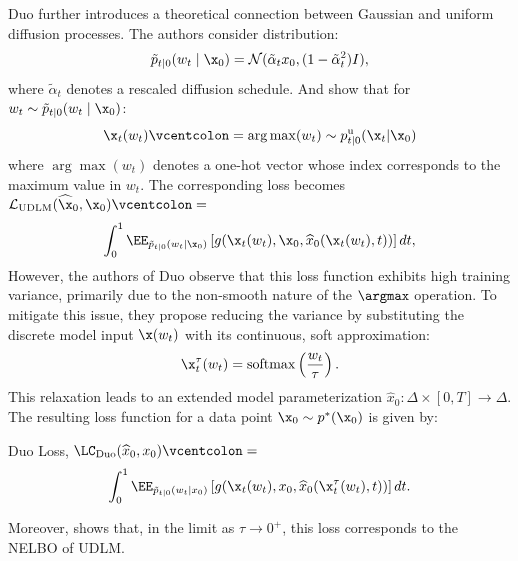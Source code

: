   Duo further introduces a theoretical connection between Gaussian and uniform diffusion processes. The authors consider distribution:
  \begin{equation}
    \tilde{p}_{t\mid 0}(w_t \mid \x_0) = \mathcal{N}(\tilde{\alpha}_t x_0, (1-\tilde{\alpha}_t^2)I), \nonumber
  \end{equation}
  where $\tilde{\alpha}_t$ denotes a rescaled diffusion schedule. And show that for $w_t \sim \tilde{p}_{t\mid 0}(w_t \mid \x_0)$:
  $$
    \x_t(w_t) \vcentcolon= \arg\max(w_t) \sim p_{t|0}^{\text{u}}(\x_t|\x_0)
  $$
  where $\arg\max(w_t)$ denotes a one-hot vector whose index corresponds to the maximum value in $w_t$.
  The corresponding loss becomes $\mathcal{L}_{\text{UDLM}}(\widehat{\x}_0,\x_0) \vcentcolon=$
  \begin{gather}
    \int_0^1 \EE_{\tilde{p}_{t\mid 0}(w_t\mid \x_0)} \left[g(\x_t(w_t),\x_0, \widehat{x}_0(\x_t(w_t), t))\right] dt, \nonumber
  \end{gather}
  However, the authors of Duo observe that this loss function exhibits high training variance, primarily due to the non-smooth nature of the $\argmax$ operation. To mitigate this issue, they propose reducing the variance by substituting the discrete model input $\x(w_t)$ with its continuous, soft approximation:
  \begin{equation}
      \x^{\tau}_{t}(w_t) = \mathrm{softmax}\left(\frac{w_t}{\tau}\right). \nonumber
  \end{equation} 
  This relaxation leads to an extended model parameterization $\widehat{x}_0 \colon \Delta \times [0, T] \to \Delta$. The resulting loss function for a data point $\x_0 \sim p^*(\x_0)$ is given by:
  \begin{Box1}{Duo Loss, $\LC_{\text{Duo}}(\widehat{x}_0, x_0) \vcentcolon=$}
    \vspace{-8pt}
    \begin{gather}
    \label{eq:duo loss}
      \int_0^1 \EE_{\tilde{p}_{t\mid 0}(w_t\mid x_0)} \left[g(\x_t(w_t),x_0, \widehat{x}_0(\x_t^{\tau}(w_t), t))\right]dt.
    \end{gather}
  \end{Box1}
  Moreover, \citet{sahoo2025the} shows that, in the limit as $\tau \to 0^{+}$, this loss corresponds to the NELBO of UDLM. 
  
  

